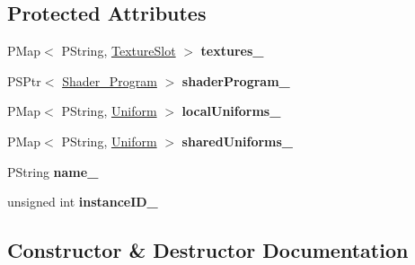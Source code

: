 \subsection*{Protected Attributes}
\begin{DoxyCompactItemize}
\item 
\mbox{\label{classprz_1_1_material_acd4a5775e669b9879671cfdb44934e08}} 
P\+Map$<$ P\+String, \mbox{\hyperlink{structprz_1_1_material_1_1_texture_slot}{Texture\+Slot}} $>$ {\bfseries textures\+\_\+}
\item 
\mbox{\label{classprz_1_1_material_afbf95635a971e5aca60cce948f2d1ae3}} 
P\+S\+Ptr$<$ \mbox{\hyperlink{classprz_1_1_shader___program}{Shader\+\_\+\+Program}} $>$ {\bfseries shader\+Program\+\_\+}
\item 
\mbox{\label{classprz_1_1_material_aa14043c45ffb013d66891d647fc0b224}} 
P\+Map$<$ P\+String, \mbox{\hyperlink{structprz_1_1_uniform}{Uniform}} $>$ {\bfseries local\+Uniforms\+\_\+}
\item 
\mbox{\label{classprz_1_1_material_a2f7157038dc7f036142d505c9a9be303}} 
P\+Map$<$ P\+String, \mbox{\hyperlink{structprz_1_1_uniform}{Uniform}} $>$ {\bfseries shared\+Uniforms\+\_\+}
\item 
\mbox{\label{classprz_1_1_material_a68a9f00e184a20736fefb85a6948c377}} 
P\+String {\bfseries name\+\_\+}
\item 
\mbox{\label{classprz_1_1_material_a0246bc267e52eb97ce79aa97a00ec069}} 
unsigned int {\bfseries instance\+I\+D\+\_\+}
\end{DoxyCompactItemize}


\subsection{Constructor \& Destructor Documentation}
\mbox{\label{classprz_1_1_material_a96a970f9168c10c004c906a10ccd7681}} 

